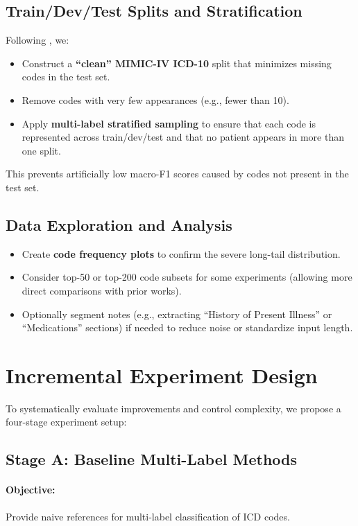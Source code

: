 \documentclass[12pt,a4paper]{report}
\begin{document}
\subsection{Train/Dev/Test Splits and Stratification}
Following \cite{edin2023automated}, we:
\begin{itemize}
    \item Construct a \textbf{“clean” MIMIC-IV ICD-10} split that minimizes missing codes in the test set.
    \item Remove codes with very few appearances (e.g., fewer than 10).
    \item Apply \textbf{multi-label stratified sampling} to ensure that each code is represented across train/dev/test and that no patient appears in more than one split.
\end{itemize}
This prevents artificially low macro-F1 scores caused by codes not present in the test set.

\subsection{Data Exploration and Analysis}
\begin{itemize}
    \item Create \textbf{code frequency plots} to confirm the severe long-tail distribution.
    \item Consider top-50 or top-200 code subsets for some experiments (allowing more direct comparisons with prior works).
    \item Optionally segment notes (e.g., extracting “History of Present Illness” or “Medications” sections) if needed to reduce noise or standardize input length.
\end{itemize}


\section{Incremental Experiment Design}

To systematically evaluate improvements and control complexity, we propose a four-stage experiment setup:

\subsection{Stage A: Baseline Multi-Label Methods}
\paragraph{Objective:} Provide naive references for multi-label classification of ICD codes.
\end{document}
